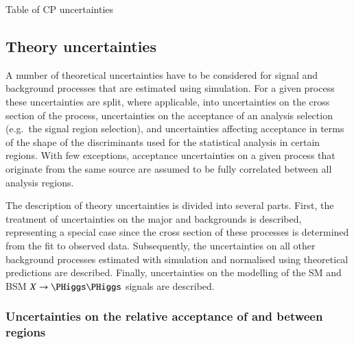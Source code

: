 \begin{table}[htbp]
  \centering

  

  \caption{Table of CP uncertainties}
  \label{tab:bla}
\end{table}




\subsection{Theory uncertainties}%
\label{sec:modelling_uncertainties}%
\label{sec:theory_uncertainties}

A number of theoretical uncertainties have to be considered for signal
and background processes that are estimated using simulation. For a
given process these uncertainties are split, where applicable, into
uncertainties on the cross section of the process, uncertainties on
the acceptance of an analysis selection (e.g.\ the signal region
selection), and uncertainties affecting acceptance in terms of the
shape of the discriminants used for the statistical analysis in
certain regions. With few exceptions, acceptance uncertainties on a
given process that originate from the same source are assumed to be
fully correlated between all analysis regions.

The description of theory uncertainties is divided into several parts.
First, the treatment of uncertainties on the major \ZHF and \ttbar
backgrounds is described, representing a special case since the cross
section of these processes is determined from the fit to observed
data. Subsequently, the uncertainties on all other background
processes estimated with simulation and normalised using theoretical
predictions are described. Finally, uncertainties on the modelling of
the SM \HH and BSM $X \to \HH$ signals are described.


\subsubsection{Uncertainties on the relative acceptance of \ZHF and
  \ttbar between regions}

